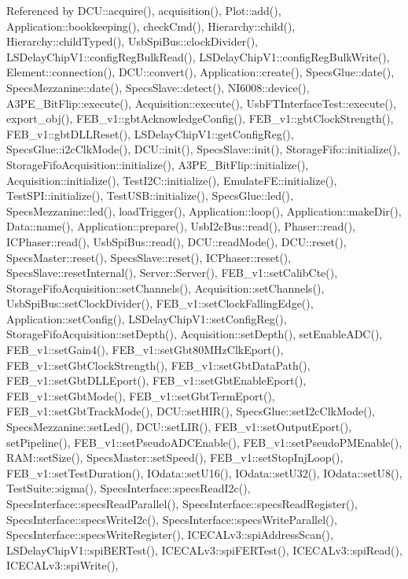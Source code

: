 Referenced by D\+C\+U\+::acquire(), acquisition(), Plot\+::add(), Application\+::bookkeeping(), check\+Cmd(), Hierarchy\+::child(), Hierarchy\+::child\+Typed(), Usb\+Spi\+Bus\+::clock\+Divider(), L\+S\+Delay\+Chip\+V1\+::config\+Reg\+Bulk\+Read(), L\+S\+Delay\+Chip\+V1\+::config\+Reg\+Bulk\+Write(), Element\+::connection(), D\+C\+U\+::convert(), Application\+::create(), Specs\+Glue\+::date(), Specs\+Mezzanine\+::date(), Specs\+Slave\+::detect(), N\+I6008\+::device(), A3\+P\+E\+\_\+\+Bit\+Flip\+::execute(), Acquisition\+::execute(), Usb\+F\+T\+Interface\+Test\+::execute(), export\+\_\+obj(), F\+E\+B\+\_\+v1\+::gbt\+Acknowledge\+Config(), F\+E\+B\+\_\+v1\+::gbt\+Clock\+Strength(), F\+E\+B\+\_\+v1\+::gbt\+D\+L\+L\+Reset(), L\+S\+Delay\+Chip\+V1\+::get\+Config\+Reg(), Specs\+Glue\+::i2c\+Clk\+Mode(), D\+C\+U\+::init(), Specs\+Slave\+::init(), Storage\+Fifo\+::initialize(), Storage\+Fifo\+Acquisition\+::initialize(), A3\+P\+E\+\_\+\+Bit\+Flip\+::initialize(), Acquisition\+::initialize(), Test\+I2\+C\+::initialize(), Emulate\+F\+E\+::initialize(), Test\+S\+P\+I\+::initialize(), Test\+U\+S\+B\+::initialize(), Specs\+Glue\+::led(), Specs\+Mezzanine\+::led(), load\+Trigger(), Application\+::loop(), Application\+::make\+Dir(), Data\+::name(), Application\+::prepare(), Usb\+I2c\+Bus\+::read(), Phaser\+::read(), I\+C\+Phaser\+::read(), Usb\+Spi\+Bus\+::read(), D\+C\+U\+::read\+Mode(), D\+C\+U\+::reset(), Specs\+Master\+::reset(), Specs\+Slave\+::reset(), I\+C\+Phaser\+::reset(), Specs\+Slave\+::reset\+Internal(), Server\+::\+Server(), F\+E\+B\+\_\+v1\+::set\+Calib\+Cte(), Storage\+Fifo\+Acquisition\+::set\+Channels(), Acquisition\+::set\+Channels(), Usb\+Spi\+Bus\+::set\+Clock\+Divider(), F\+E\+B\+\_\+v1\+::set\+Clock\+Falling\+Edge(), Application\+::set\+Config(), L\+S\+Delay\+Chip\+V1\+::set\+Config\+Reg(), Storage\+Fifo\+Acquisition\+::set\+Depth(), Acquisition\+::set\+Depth(), set\+Enable\+A\+D\+C(), F\+E\+B\+\_\+v1\+::set\+Gain4(), F\+E\+B\+\_\+v1\+::set\+Gbt80\+M\+Hz\+Clk\+Eport(), F\+E\+B\+\_\+v1\+::set\+Gbt\+Clock\+Strength(), F\+E\+B\+\_\+v1\+::set\+Gbt\+Data\+Path(), F\+E\+B\+\_\+v1\+::set\+Gbt\+D\+L\+L\+Eport(), F\+E\+B\+\_\+v1\+::set\+Gbt\+Enable\+Eport(), F\+E\+B\+\_\+v1\+::set\+Gbt\+Mode(), F\+E\+B\+\_\+v1\+::set\+Gbt\+Term\+Eport(), F\+E\+B\+\_\+v1\+::set\+Gbt\+Track\+Mode(), D\+C\+U\+::set\+H\+I\+R(), Specs\+Glue\+::set\+I2c\+Clk\+Mode(), Specs\+Mezzanine\+::set\+Led(), D\+C\+U\+::set\+L\+I\+R(), F\+E\+B\+\_\+v1\+::set\+Output\+Eport(), set\+Pipeline(), F\+E\+B\+\_\+v1\+::set\+Pseudo\+A\+D\+C\+Enable(), F\+E\+B\+\_\+v1\+::set\+Pseudo\+P\+M\+Enable(), R\+A\+M\+::set\+Size(), Specs\+Master\+::set\+Speed(), F\+E\+B\+\_\+v1\+::set\+Stop\+Inj\+Loop(), F\+E\+B\+\_\+v1\+::set\+Test\+Duration(), I\+Odata\+::set\+U16(), I\+Odata\+::set\+U32(), I\+Odata\+::set\+U8(), Test\+Suite\+::sigma(), Specs\+Interface\+::specs\+Read\+I2c(), Specs\+Interface\+::specs\+Read\+Parallel(), Specs\+Interface\+::specs\+Read\+Register(), Specs\+Interface\+::specs\+Write\+I2c(), Specs\+Interface\+::specs\+Write\+Parallel(), Specs\+Interface\+::specs\+Write\+Register(), I\+C\+E\+C\+A\+Lv3\+::spi\+Address\+Scan(), L\+S\+Delay\+Chip\+V1\+::spi\+B\+E\+R\+Test(), I\+C\+E\+C\+A\+Lv3\+::spi\+F\+E\+R\+Test(), I\+C\+E\+C\+A\+Lv3\+::spi\+Read(), I\+C\+E\+C\+A\+Lv3\+::spi\+Write(), 